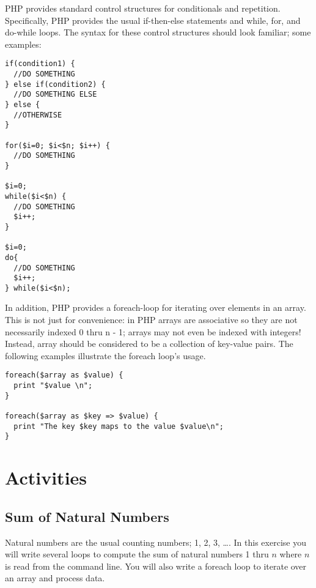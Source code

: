 \documentclass[12pt]{scrartcl}
\begin{document}
PHP provides standard control structures for conditionals and repetition.  Specifically, PHP provides the usual if-then-else statements and while, for, and do-while loops.  The syntax for these control structures should look familiar; some examples:

\begin{verbatim}
if(condition1) {
  //DO SOMETHING
} else if(condition2) {
  //DO SOMETHING ELSE
} else {
  //OTHERWISE
}

for($i=0; $i<$n; $i++) {
  //DO SOMETHING
}

$i=0;
while($i<$n) {
  //DO SOMETHING
  $i++;
}

$i=0;
do{ 
  //DO SOMETHING
  $i++;
} while($i<$n);
\end{verbatim}

In addition, PHP provides a foreach-loop for iterating over elements in 
an array.  This is not just for convenience: in PHP arrays are associative 
so they are not necessarily indexed 0 thru n - 1; arrays may not even 
be indexed with integers!  Instead, array should be considered to be a
collection of key-value pairs.  The following examples illustrate the 
foreach loop's usage.

\begin{verbatim}
foreach($array as $value) {
  print "$value \n";
}

foreach($array as $key => $value) {
  print "The key $key maps to the value $value\n";
}
\end{verbatim}

\section*{Activities}

\subsection*{Sum of Natural Numbers}

Natural numbers are the usual counting numbers; 1, 2, 3, \ldots.  In 
this exercise you will write several loops to compute the sum of 
natural numbers 1 thru $n$ where $n$ is read from the command line.  
You will also write a foreach loop to iterate over an array and 
process data.
\end{document}
